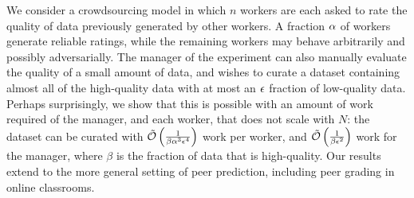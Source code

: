 We consider a crowdsourcing model in which $n$ workers are each asked to 
rate the quality of data previously generated by other workers.
A fraction $\alpha$ of workers generate reliable ratings, 
while the remaining workers may behave arbitrarily and possibly adversarially. 
The manager of the experiment can also manually evaluate the quality of a 
small amount of data, and wishes to curate a dataset containing almost all 
of the high-quality data with at most an $\epsilon$ fraction of low-quality data.  
Perhaps surprisingly, we show that this is possible with an 
amount of work required of the manager, and each worker, that does not scale 
with $N$: the dataset can be curated with
$\tilde{\mathcal{O}}\left( \frac{1}{\beta\alpha^3\epsilon^4} \right)$ 
work per worker, and $\tilde{\mathcal{O}}\left( \frac{1}{\beta\epsilon^2} \right)$ 
work for the manager, where $\beta$ is the fraction of data that is high-quality.
Our results extend to the more general setting of peer prediction, 
including peer grading in online classrooms.
